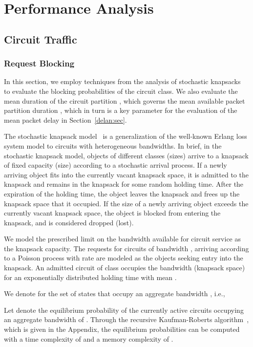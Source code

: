 \documentclass[article]{IEEEtran}
\begin{document}
\section{Performance Analysis}
\label{sec:analysis}

\subsection{Circuit Traffic}
\label{percir:sec}
\subsubsection{Request Blocking}
\label{reqblo:sec}
In this section, we employ techniques from the analysis of
stochastic knapsacks~\cite{Ross95} to evaluate the blocking probabilities
 of the circuit class.
We also evaluate the mean duration of the circuit partition ,
which governs the mean available packet partition duration ,
which in turn is a key parameter for the evaluation of the mean
packet delay in Section~\ref{delan:sec}.

The stochastic knapsack model~\cite{Ross95} is a generalization of the
well-known Erlang loss system model to circuits with heterogeneous
bandwidths.
In brief, in the stochastic knapsack model, objects of different
classes (sizes) arrive to a knapsack of fixed capacity (size)
according to a stochastic arrival process.
If a newly arriving object fits into the currently vacant knapsack
space, it is admitted to the knapsack and remains in the knapsack
for some random holding time. After the expiration of the holding time,
the object leaves the knapsack and frees up the knapsack space that
it occupied.
If the size of a newly arriving object exceeds the currently
vacant knapsack space, the object is blocked from entering the knapsack,
and is considered dropped (lost).

We model the prescribed limit  on the bandwidth available for circuit
service as the knapsack capacity.
The requests for circuits of bandwidth ,
arriving according to a Poisson process with rate
 are modeled as the objects seeking entry into the knapsack.
An admitted circuit of class  occupies the bandwidth (knapsack space)
 for an exponentially distributed holding time with mean .

We denote  for the set of states
 that occupy an aggregate bandwidth
, i.e.,

Let  denote the equilibrium probability of the
currently active circuits occupying an aggregate bandwidth of .
Through the recursive Kaufman-Roberts algorithm~\cite[p. 23]{Ross95},
which is given in the Appendix, the equilibrium probabilities
 can be computed with a time complexity of
 and a memory complexity of .
\end{document}
